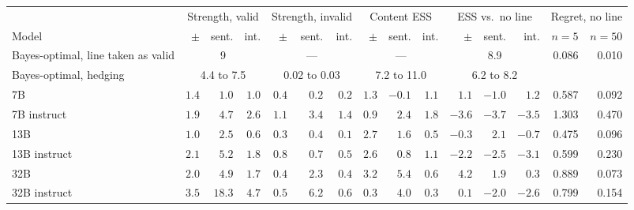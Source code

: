 \begin{tabular}{lrrrrrrrrrrrrrr}
\toprule
& \multicolumn{3}{c}{Strength, valid} & \multicolumn{3}{c}{Strength, invalid} & \multicolumn{3}{c}{Content ESS} & \multicolumn{3}{c}{ESS vs.\ no line} & \multicolumn{2}{c}{Regret, no line} \\
\cmidrule(lr){2-4}\cmidrule(lr){5-7}\cmidrule(lr){8-10}\cmidrule(lr){11-13}\cmidrule(lr){14-15}
Model & $\pm$ & sent. & int. & $\pm$ & sent. & int. & $\pm$ & sent. & int. & $\pm$ & sent. & int. & $n = 5$ & $n = 50$ \\
\midrule
Bayes-optimal, line taken as valid & \multicolumn{3}{c}{9} & \multicolumn{3}{c}{---} & \multicolumn{3}{c}{---} & \multicolumn{3}{c}{8.9} & 0.086 & 0.010 \\
Bayes-optimal, hedging & \multicolumn{3}{c}{4.4 to 7.5} & \multicolumn{3}{c}{0.02 to 0.03} & \multicolumn{3}{c}{7.2 to 11.0} & \multicolumn{3}{c}{6.2 to 8.2} & & \\
\midrule
7B & $1.4$ & $1.0$ & $1.0$ & $0.4$ & $0.2$ & $0.2$ & $1.3$ & $-0.1$ & $1.1$ & $1.1$ & $-1.0$ & $1.2$ & 0.587 & 0.092 \\
7B instruct & $1.9$ & $4.7$ & $2.6$ & $1.1$ & $3.4$ & $1.4$ & $0.9$ & $2.4$ & $1.8$ & $-3.6$ & $-3.7$ & $-3.5$ & 1.303 & 0.470 \\
13B & $1.0$ & $2.5$ & $0.6$ & $0.3$ & $0.4$ & $0.1$ & $2.7$ & $1.6$ & $0.5$ & $-0.3$ & $2.1$ & $-0.7$ & 0.475 & 0.096 \\
13B instruct & $2.1$ & $5.2$ & $1.8$ & $0.8$ & $0.7$ & $0.5$ & $2.6$ & $0.8$ & $1.1$ & $-2.2$ & $-2.5$ & $-3.1$ & 0.599 & 0.230 \\
32B & $2.0$ & $4.9$ & $1.7$ & $0.4$ & $2.3$ & $0.4$ & $3.2$ & $5.4$ & $0.6$ & $4.2$ & $1.9$ & $0.3$ & 0.889 & 0.073 \\
32B instruct & $3.5$ & $18.3$ & $4.7$ & $0.5$ & $6.2$ & $0.6$ & $0.3$ & $4.0$ & $0.3$ & $0.1$ & $-2.0$ & $-2.6$ & 0.799 & 0.154 \\
\bottomrule
\end{tabular}
